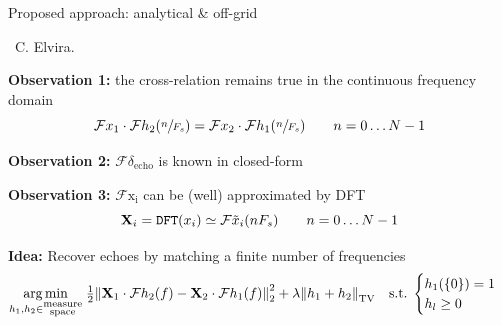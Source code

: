 \begin{frame}{Proposed approach: analytical \& off-grid \hfill\faJediOrder}

    {\hfill \faPeopleCarry~C. Elvira.}

    \begin{block}{\textbf{Observation 1:} the cross-relation remains true in the \alert{continuous} frequency domain}
        \begin{equation*}
            \mathcal{F}x_1 \cdot \mathcal{F}h_2 (\sfrac{n}{F_s}) = \mathcal{F}x_2 \cdot \mathcal{F}h_1(\sfrac{n}{F_s}) \qquad n=0\dots N-1
        \end{equation*}
        \end{block}

        \vspace{.5em}

        \pause
        \begin{block}{\textbf{Observation 2:} $\mathcal{F}\delta_{\mathrm{echo}}$ is known in \alert{closed-form}}
        \end{block}

        \pause
        \vspace{1.em}
        \begin{block}{\textbf{Observation 3:} $\mathcal{F}{\mathrm{x_i}}$ can be (well) approximated by \alert{DFT}}
        \begin{equation*}
            \mathbf{X}_i = \texttt{DFT}(x_i) \simeq  \mathcal{F}{\tilde{x}_i}(nF_s) \qquad n=0\dots N-1
        \end{equation*}
        \end{block}


        \pause
        \vfill
        \begin{block}{\textbf{Idea:} Recover echoes by matching a finite number of frequencies}
        \begin{equation*}
            \underset{h_1,h_2 \in \substack{\text{measure} \\ \text{space}}}{\arg\min} \;
            \tfrac{1}{2} \kvvbar{
                \mathbf{X}_1 \cdot \mathcal{F}h_2 (f) - \mathbf{X}_2 \cdot \mathcal{F}h_1(f)
            }_2^2
            + \lambda \kvvbar{h_1 + h_2}_{\mathrm{TV}}
            \quad
            \text{s.t.}\;
            \begin{cases}
                h_1(\{0\})=1 \\
                h_l \geq 0
                \end{cases}
        \end{equation*}
        \end{block}


\end{frame}
